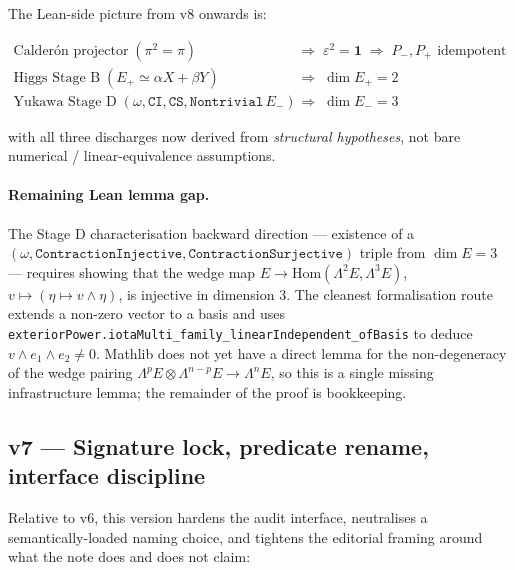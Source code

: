 \smallskip
The Lean-side picture from v8 onwards is:

\[
\begin{aligned}
\text{Calder\'on projector}\; (\pi^2 = \pi)
&\;\Rightarrow\; \varepsilon^2 = \mathbf 1 \;\Rightarrow\; P_-, P_+ \text{ idempotent}\\
\text{Higgs Stage B}\; (E_+ \simeq \alpha X + \beta Y)
&\;\Rightarrow\; \dim E_+ = 2\\
\text{Yukawa Stage D}\; (\omega, \texttt{CI}, \texttt{CS}, \texttt{Nontrivial}\,E_-)
&\;\Rightarrow\; \dim E_- = 3
\end{aligned}
\]

with all three discharges now derived from \emph{structural
hypotheses}, not bare numerical / linear-equivalence
assumptions.

\paragraph{Remaining Lean lemma gap.}
The Stage D characterisation backward direction --- existence
of a $(\omega, \texttt{ContractionInjective},
\texttt{ContractionSurjective})$ triple from $\dim E = 3$ ---
requires showing that the wedge map
$E \to \mathrm{Hom}(\Lambda^2 E, \Lambda^3 E)$, $v \mapsto (\eta \mapsto v \wedge \eta)$,
is injective in dimension 3. The cleanest formalisation route
extends a non-zero vector to a basis and uses
\texttt{exteriorPower.iotaMulti\_family\_linearIndependent\_ofBasis}
to deduce $v \wedge e_1 \wedge e_2 \neq 0$. Mathlib does not
yet have a direct lemma for the non-degeneracy of the wedge
pairing $\Lambda^p E \otimes \Lambda^{n-p} E \to \Lambda^n E$,
so this is a single missing infrastructure lemma; the
remainder of the proof is bookkeeping.

\subsection*{v7 --- Signature lock, predicate rename, interface
discipline}

Relative to v6, this version hardens the audit interface,
neutralises a semantically-loaded naming choice, and tightens
the editorial framing around what the note does and does not
claim:

